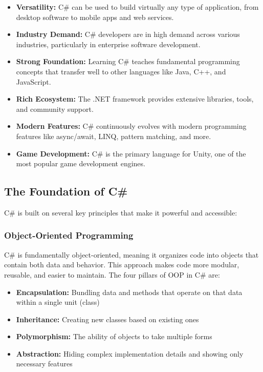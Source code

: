 \documentclass{article}
\begin{document}
\begin{itemize}
    \item \textbf{Versatility:} C\# can be used to build virtually any type of application, from desktop software to mobile apps and web services.
    \item \textbf{Industry Demand:} C\# developers are in high demand across various industries, particularly in enterprise software development.
    \item \textbf{Strong Foundation:} Learning C\# teaches fundamental programming concepts that transfer well to other languages like Java, C++, and JavaScript.
    \item \textbf{Rich Ecosystem:} The .NET framework provides extensive libraries, tools, and community support.
    \item \textbf{Modern Features:} C\# continuously evolves with modern programming features like async/await, LINQ, pattern matching, and more.
    \item \textbf{Game Development:} C\# is the primary language for Unity, one of the most popular game development engines.
\end{itemize}

\subsection{The Foundation of C\#}
C\# is built on several key principles that make it powerful and accessible:

\subsubsection{Object-Oriented Programming}
C\# is fundamentally object-oriented, meaning it organizes code into objects that contain both data and behavior. This approach makes code more modular, reusable, and easier to maintain. The four pillars of OOP in C\# are:
\begin{itemize}
    \item \textbf{Encapsulation:} Bundling data and methods that operate on that data within a single unit (class)
    \item \textbf{Inheritance:} Creating new classes based on existing ones
    \item \textbf{Polymorphism:} The ability of objects to take multiple forms
    \item \textbf{Abstraction:} Hiding complex implementation details and showing only necessary features
\end{itemize}
\end{document}
